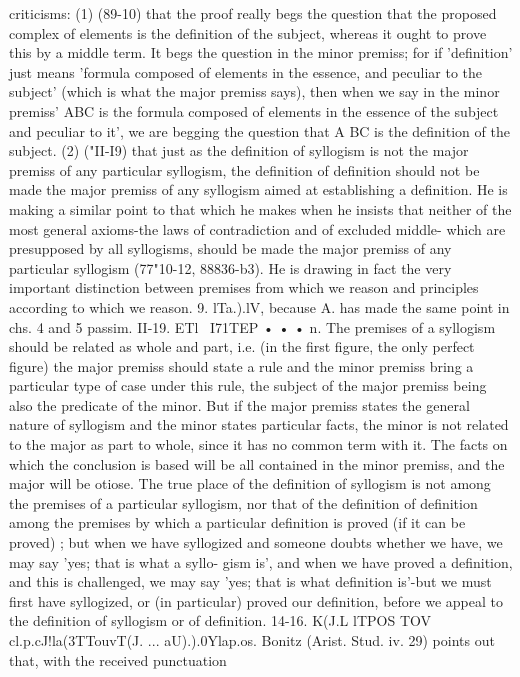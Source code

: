 {{{{{{{{{{{{{{{{{{{{criticisms: (1) (89-10) that the proof really begs the question that
the proposed complex of elements is the definition of the subject,
whereas it ought to prove this by a middle term. It begs the
question in the minor premiss; for if 'definition' just means
'formula composed of elements in the essence, and peculiar to
the subject' (which is what the major premiss says), then when
we say in the minor premiss' ABC is the formula composed of
elements in the essence of the subject and peculiar to it', we are
begging the question that A BC is the definition of the subject.
(2) ("II-I9) that just as the definition of syllogism is not the major
premiss of any particular syllogism, the definition of definition
should not be made the major premiss of any syllogism aimed at
establishing a definition. He is making a similar point to that
which he makes when he insists that neither of the most general
axioms-the laws of contradiction and of excluded middle-
which are presupposed by all syllogisms, should be made the
major premiss of any particular syllogism (77"10-12, 88836-b3).
He is drawing in fact the very important distinction between premises
 from which we reason and principles according to
which we reason.
9. lTa.).lV, because A. has made the same point in chs. 4 and 5
passim.
II-19. ETl ~I71TEP • • • n. The premises of a syllogism should
be related as whole and part, i.e. (in the first figure, the only
perfect figure) the major premiss should state a rule and the
minor premiss bring a particular type of case under this rule, the
subject of the major premiss being also the predicate of the minor.
But if the major premiss states the general nature of syllogism
and the minor states particular facts, the minor is not related
to the major as part to whole, since it has no common term with
it. The facts on which the conclusion is based will be all contained
in the minor premiss, and the major will be otiose. The true
place of the definition of syllogism is not among the premises
of a particular syllogism, nor that of the definition of definition
among the premises by which a particular definition is proved
(if it can be proved) ; but when we have syllogized and someone
doubts whether we have, we may say 'yes; that is what a syllo-
gism is', and when we have proved a definition, and this is
challenged, we may say 'yes; that is what definition is'-but we
must first have syllogized, or (in particular) proved our definition,
before we appeal to the definition of syllogism or of definition.
14-16. K(J.L lTPOS TOV cl.p.cJ!la(3T}TouvT(J. ... aU).).0Ylap.os. Bonitz
(Arist. Stud. iv. 29) points out that, with the received punctuation
}}}}}}}}}}}}}}}}}}}
